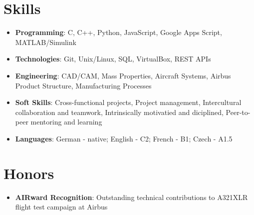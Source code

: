 \documentclass[letterpaper,11pt]{article}
\newcommand{\resumeItem}[2]{
  \item\small{
    \textbf{#1}{: #2 \vspace{-1pt}}
  }
}
\newcommand{\resumeSubItem}[2]{\resumeItem{#1}{#2}\vspace{-1pt}}
\newcommand{\resumeSubHeadingListStart}{\begin{itemize}[leftmargin=*,label={},itemsep=1.5pt]}
\newcommand{\resumeSubHeadingListStartBullets}{\begin{itemize}[leftmargin=*,itemsep=1.5pt]}
\newcommand{\resumeSubHeadingListEnd}{\end{itemize}}
\begin{document}
\section{Skills}
\resumeSubHeadingListStart
\resumeSubItem{Programming}{C, C++, Python, JavaScript, Google Apps Script, MATLAB/Simulink}
\resumeSubItem{Technologies}{Git, Unix/Linux, SQL, VirtualBox, REST APIs}
\resumeSubItem{Engineering}{CAD/CAM, Mass Properties, Aircraft Systems, Airbus Product Structure, Manufacturing Processes}
\resumeSubItem{Soft Skills}{Cross-functional projects, Project management, Intercultural collaboration and teamwork, Intrinsically motivatied and diciplined, Peer-to-peer mentoring and learning}
\resumeSubItem{Languages}{German - native; English - C2; French - B1; Czech - A1.5}
\resumeSubHeadingListEnd

\section{Honors}
\resumeSubHeadingListStartBullets
\resumeSubItem{AIRward Recognition}
{Outstanding technical contributions to A321XLR flight test campaign at Airbus}
\resumeSubHeadingListEnd
\end{document}

